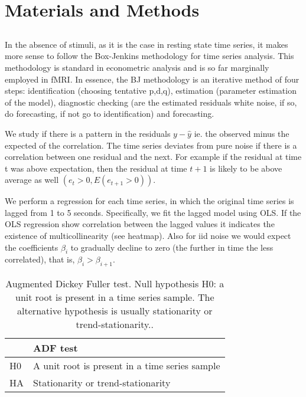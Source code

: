\documentclass[10pt,letterpaper]{article}
\begin{document}
\section*{Materials and Methods}
\subsection*{}
In the absence of stimuli, as it is the case in resting state time series, it makes more sense to follow the Box-Jenkins methodology for time series analysis. 
This methodology is standard in econometric analysis and is so far marginally employed in fMRI.  
In essence, the BJ methodology is an iterative method of four steps: identification (choosing tentative p,d,q), estimation (parameter estimation of the model), diagnostic checking (are the estimated residuals white noise, if so, do forecasting, if not go to identification) and forecasting.


We study if there is a pattern in the residuals $y - \hat{y}$ ie. the observed minus the expected of the correlation.
The time series deviates from pure noise if there is a correlation between one residual and the next. For example if the residual at time t was above expectation, then the residual at time $t+1$ is likely to be above average as well $(e_t >0, E(e_{t+1}>0))$.

We perform a regression for each time series, in which the original time series is lagged from 1 to 5 seconds. Specifically, we fit the lagged model using OLS. If the OLS regression show correlation between the lagged values it indicates the existence of multicollinearity (see heatmap).
Also for iid noise we would expect the coefficients $\beta_i$ to gradually decline to zero (the further in time the less correlated), that is, $\beta_i > \beta_{i+1}$.


\begin{table}[ht]
\centering
\begin{tabular}{|l|l|}
\hline
 & ADF test\\
\hline
H0 & A unit root is present in a time series sample  \\
\hline
HA & Stationarity or trend-stationarity  \\
\hline
\end{tabular}
\caption{\label{tab:adf}Augmented Dickey Fuller test. Null hypothesis H0: a unit root is present in a time series sample. The alternative hypothesis is usually stationarity or trend-stationarity..}
\end{table}
\end{document}
